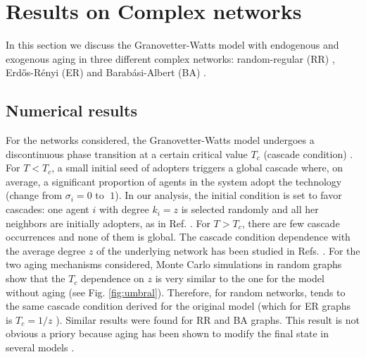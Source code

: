 \section{\label{sec:Complex networks} Results  on Complex networks}

In this section we discuss the Granovetter-Watts model with endogenous and exogenous aging in three different complex networks: random-regular (RR) \cite{wormald_1999}, Erd\H{o}s-R\'enyi (ER) \cite{erdos1960evolution} and Barab\'asi-Albert (BA) \cite{barabasi2009scale}.

\subsection{\label{subsec:Numerical results} Numerical results}

For the networks considered, the Granovetter-Watts model undergoes a discontinuous phase transition at a certain critical value $T_{c}$ (cascade condition) \cite{watts-2002}. For $T<T_c$, a small initial seed of adopters triggers a global cascade where, on average, a significant proportion of agents in the system adopt the technology (change from $\sigma_i = 0 \mbox{ to } \; 1$). In our analysis, the initial condition is set to favor cascades: one agent $i$ with degree $k_i = z$ is selected randomly and all her neighbors are initially adopters, as in Ref. \cite{centola-2007,singh-2013}. For $T>T_c$, there are few cascade occurrences and none of them is global. The cascade condition dependence with the average degree $z$ of the underlying network has been studied in Refs. \cite{watts-2002, gleeson-2007}. For the two aging mechanisms considered, Monte Carlo simulations in random graphs show that the $T_c$ dependence on $z$ is very similar to the one for the model without aging (see Fig. \ref{fig:umbral}). Therefore, for random networks, tends to the same cascade condition derived for the original model (which for ER graphs is $T_{c} = 1 / z$ \cite{watts-2002}). Similar results were found for RR and BA graphs. This result is not obvious a priory because aging has been shown to modify the final state in several models \cite{fernandez-gracia-2013,artime-2018,peralta-2020C,peralta-2020A,chen-2020,fernandez-gracia-2011,perez-2016,stark-2008}. 

